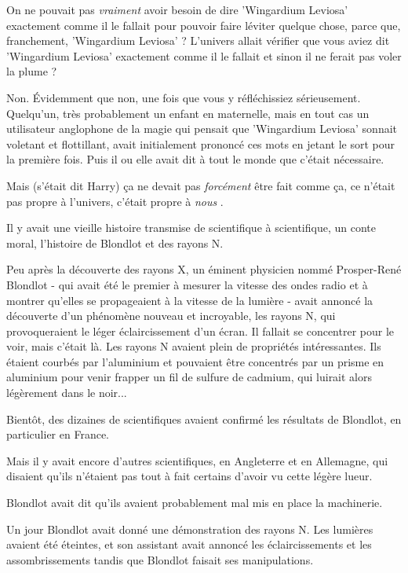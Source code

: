 On ne pouvait pas \emph{vraiment}  avoir besoin de dire 'Wingardium Leviosa' exactement comme il le fallait pour pouvoir faire léviter quelque chose, parce que, franchement, 'Wingardium Leviosa' ? L'univers allait vérifier que vous aviez dit 'Wingardium Leviosa' exactement comme il le fallait et sinon il ne ferait pas voler la plume ?

Non. Évidemment que non, une fois que vous y réfléchissiez sérieusement. Quelqu'un, très probablement un enfant en maternelle, mais en tout cas un utilisateur anglophone de la magie qui pensait que 'Wingardium Leviosa' sonnait voletant et flottillant, avait initialement prononcé ces mots en jetant le sort pour la première fois. Puis il ou elle avait dit à tout le monde que c'était nécessaire.

Mais (s'était dit Harry) ça ne devait pas \emph{forcément}  être fait comme ça, ce n'était pas propre à l'univers, c'était propre à \emph{nous} .

Il y avait une vieille histoire transmise de scientifique à scientifique, un conte moral, l'histoire de Blondlot et des rayons N.

Peu après la découverte des rayons X, un éminent physicien nommé Prosper-René Blondlot - qui avait été le premier à mesurer la vitesse des ondes radio et à montrer qu'elles se propageaient à la vitesse de la lumière - avait annoncé la découverte d'un phénomène nouveau et incroyable, les rayons N, qui provoqueraient le léger éclaircissement d'un écran. Il fallait se concentrer pour le voir, mais c'était là. Les rayons N avaient plein de propriétés intéressantes. Ils étaient courbés par l'aluminium et pouvaient être concentrés par un prisme en aluminium pour venir frapper un fil de sulfure de cadmium, qui luirait alors légèrement dans le noir...

Bientôt, des dizaines de scientifiques avaient confirmé les résultats de Blondlot, en particulier en France.

Mais il y avait encore d'autres scientifiques, en Angleterre et en Allemagne, qui disaient qu'ils n'étaient pas tout à fait certains d'avoir vu cette légère lueur.

Blondlot avait dit qu'ils avaient probablement mal mis en place la machinerie.

Un jour Blondlot avait donné une démonstration des rayons N. Les lumières avaient été éteintes, et son assistant avait annoncé les éclaircissements et les assombrissements tandis que Blondlot faisait ses manipulations.

